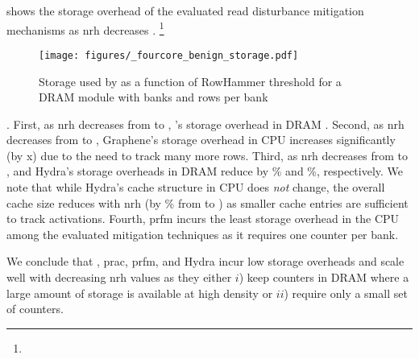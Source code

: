 \label{subsec:storageeval}
 shows the storage overhead  of the evaluated read disturbance mitigation mechanisms as \gls{nrh} decreases .
\footnote{}

\begin{figure}[h]
\centering
\texttt{[image: figures/\_fourcore\_benign\_storage.pdf]}
\caption{Storage used by  as a function of RowHammer threshold for a DRAM module with  banks and  rows per bank}
\label{fig:benign_storage}
\end{figure}

.
First, as \gls{nrh} decreases from  to , \X{}'s storage overhead in DRAM .
Second, as \gls{nrh} decreases from  to , Graphene's storage overhead in CPU increases significantly (by x) due to the need to track many more rows.
Third, as \gls{nrh} decreases from  to ,  and Hydra's storage overheads in DRAM reduce by \% and \%, respectively.
We note that while Hydra's cache structure in CPU does \emph{not} change, the overall cache size reduces with \gls{nrh} (by \% from  to ) as smaller cache entries are sufficient to track activations.
Fourth, \gls{prfm} incurs the least storage overhead in the CPU among the evaluated mitigation techniques as it requires  one counter per bank.

We conclude that \X{}, \gls{prac}, \gls{prfm}, and Hydra incur low storage overheads and scale well with decreasing \gls{nrh} values as they either $i$) keep counters in DRAM where a large amount of storage is available at high density or $ii$) require only a small set of counters.

